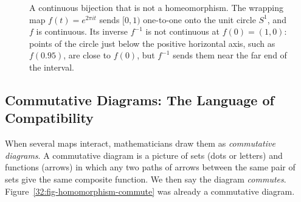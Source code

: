 \begin{figure}[htbp]
\caption{A continuous bijection that is not a homeomorphism. The wrapping map $f(t) = e^{2\pi i t}$ sends $[0, 1)$ one-to-one onto the unit circle $S^1$, and $f$ is continuous. Its inverse $f^{-1}$ is not continuous at $f(0) = (1, 0)$: points of the circle just below the positive horizontal axis, such as $f(0.95)$, are close to $f(0)$, but $f^{-1}$ sends them near the far end of the interval.}
\label{32:fig-wrapping-tearing}
\end{figure}

\subsection{Commutative Diagrams: The Language of Compatibility}

When several maps interact, mathematicians draw them as \emph{commutative diagrams}. A commutative diagram is a picture of sets (dots or letters) and functions (arrows) in which any two paths of arrows between the same pair of sets give the same composite function. We then say the diagram \emph{commutes}. Figure~\ref{32:fig-homomorphism-commute} was already a commutative diagram.

